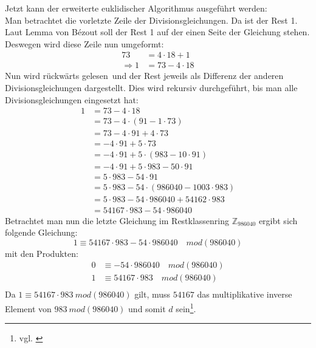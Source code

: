 Jetzt kann der erweiterte euklidischer Algorithmus ausgeführt werden:\\
Man betrachtet die vorletzte Zeile der Divisionsgleichungen. Da ist der Rest 1.\\
Laut Lemma von Bézout soll der Rest 1 auf der einen Seite der Gleichung stehen. Deswegen wird diese Zeile nun umgeformt:
\begin{align*}
73 &= 4 \cdot 18 + 1\\
\Rightarrow 1 &= 73-4\cdot 18
\end{align*}
Nun wird \glqq rückwärts gelesen\grqq~und der Rest jeweils als Differenz der anderen Divisionsgleichungen dargestellt. Dies wird rekursiv durchgeführt, bis man alle Divisionsgleichungen eingesetzt hat:
\begin{align*}
1 &= 73-4\cdot 18\\
  &= 73-4\cdot (91-1\cdot 73)\\
  &= 73-4\cdot91+4\cdot73\\
  &= -4\cdot91+5\cdot73\\
  &= -4\cdot91+5\cdot(983-10\cdot91)\\
  &= -4\cdot91+5\cdot983-50\cdot91\\
  &= 5\cdot983-54\cdot91\\
  &= 5\cdot983-54\cdot(986040-1003\cdot983)\\
  &= 5\cdot983-54\cdot986040+54162\cdot983\\
  &= 54167\cdot983-54\cdot986040
\end{align*}
Betrachtet man nun die letzte Gleichung im Restklassenring $\mathbb{Z}_{986040}$ ergibt sich folgende Gleichung:
\begin{equation*}
1 \equiv54167\cdot983-54\cdot 986040 \quad mod(986040)
\end{equation*}
mit den Produkten:
\begin{align*}
0 &\equiv -54\cdot 986040 \quad mod(986040)\\
1 &\equiv 54167\cdot 983 \quad mod(986040)\\
\end{align*}
Da $1 \equiv 54167\cdot 983~mod(986040)$ gilt, muss $54167$ das multiplikative inverse Element von $983~mod(986040)$ und somit $d$ sein\footnote{vgl. \cite{inverse}}.
